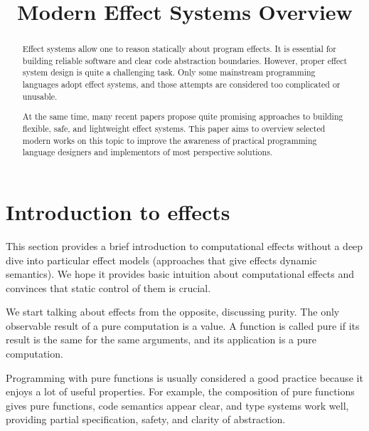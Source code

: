 \documentclass[conference]{IEEEtran}
\begin{document}
    \title{Modern Effect Systems Overview
    }

    \author{
    }

    \maketitle


    \begin{abstract}
        Effect systems allow one to reason statically about program effects.
        It is essential for building reliable software and clear code abstraction boundaries.
        However, proper effect system design is quite a challenging task.
        Only some mainstream programming languages adopt effect systems, and those attempts are considered too complicated or unusable.

        At the same time, many recent papers propose quite promising approaches to building flexible, safe, and lightweight effect systems.
        This paper aims to overview selected modern works on this topic to improve the awareness of practical programming language designers and implementors of most perspective solutions.
    \end{abstract}


    \section{Introduction to effects}

    This section provides a brief introduction to computational effects without a deep dive into particular effect models (approaches that give effects dynamic semantics).
    We hope it provides basic intuition about computational effects and convinces that static control of them is crucial.

    We start talking about effects from the opposite, discussing purity.
    The only observable result of a pure computation is a value.
    A function is called pure if its result is the same for the same arguments, and its application is a pure computation.

    Programming with pure functions is usually considered a good practice because it enjoys a lot of useful properties.
    For example, the composition of pure functions gives pure functions, code semantics appear clear, and type systems work well, providing partial specification, safety, and clarity of abstraction.
\end{document}
